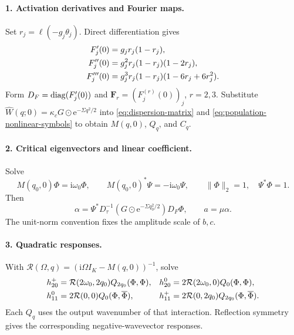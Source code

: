 \documentclass[11pt]{article}
\newcommand{\ii}{\mathrm{i}}
\newcommand{\ee}{\mathrm{e}}
\newcommand{\cR}{\mathcal{R}}
\begin{document}
\paragraph{1. Activation derivatives and Fourier maps.}
Set $r_j=\ell(-g_j\theta_j)$. Direct differentiation gives
\begin{align}
 F'_j(0)&=g_jr_j(1-r_j),\notag\\
 F''_j(0)&=g_j^2r_j(1-r_j)(1-2r_j),\notag\\
 F'''_j(0)&=g_j^3r_j(1-r_j)(1-6r_j+6r_j^2).
 \label{eq:v1-activation-derivatives}
\end{align}
Form $D_F=\operatorname{diag}(F'_j(0))$ and $\boldsymbol F_r=(F_j^{(r)}(0))_j$,
$r=2,3$. Substitute $\widehat W(q;0)=\kappa_cG\odot\ee^{-\Sigma q^2/2}$
into \eqref{eq:dispersion-matrix} and
\eqref{eq:population-nonlinear-symbols} to obtain $M(q,0)$, $Q_q$, and $C_q$.

\paragraph{2. Critical eigenvectors and linear coefficient.}
Solve
\begin{equation}
 M(q_0,0)\Phi=\ii\omega_0\Phi,\qquad
 M(q_0,0)^*\Psi=-\ii\omega_0\Psi,\qquad
 \|\Phi\|_2=1,\quad\Psi^*\Phi=1.
\end{equation}
Then
\begin{equation}
 \alpha=\Psi^*D_\tau^{-1}
       (G\odot\ee^{-\Sigma q_0^2/2})D_F\Phi,\qquad a=\mu\alpha.
 \label{eq:v1-alpha-computation}
\end{equation}
The unit-norm convention fixes the amplitude scale of $b,c$.

\paragraph{3. Quadratic responses.}
With $\cR(\Omega,q)=(\ii\Omega I_K-M(q,0))^{-1}$, solve
\begin{align}
 h_{20}^+&=\cR(2\omega_0,2q_0)Q_{2q_0}(\Phi,\Phi),&
 h_{20}^0&=2\cR(2\omega_0,0)Q_0(\Phi,\Phi),\notag\\
 h_{11}^0&=2\cR(0,0)Q_0(\Phi,\overline\Phi),&
 h_{11}^+&=2\cR(0,2q_0)Q_{2q_0}(\Phi,\overline\Phi).
 \label{eq:v1-quadratic-responses}
\end{align}
Each $Q_q$ uses the output wavenumber of that interaction.
Reflection symmetry gives the corresponding negative-wavevector responses.
\end{document}
